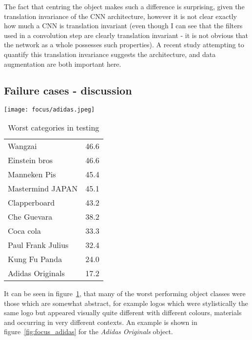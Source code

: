 The fact that centring the object makes such a difference is surprising, given the translation invariance of the CNN architecture, however it is not clear exactly how much a CNN is translation invariant (even though I can see that the filters used in a convolution step are clearly translation invariant - it is not obvious that the network as a whole possesses such properties). A recent study attempting to quantify this translation invariance \cite{EricKauderer-Abrams2016} suggests the architecture, and data augmentation are both important here. 


\subsection {Failure cases - discussion}


\begin{figure*}[t]
    \caption{Example of one hard case in the INSTRE dataset}
\centering
\texttt{[image: focus/adidas.jpeg]}
\label{fig:focus_adidas}
\end{figure*}



\begin{table}[h]
\centering
\caption{Worst categories in testing }
\begin{tabular}{ l l }
  \toprule 
  Wangzai & 46.6 \\
  Einstein bros & 46.6\\
  Manneken Pis & 45.4\\
  Mastermind JAPAN & 45.1\\
  Clapperboard & 43.2\\
  Che Guevara & 38.2\\
  Coca cola & 33.3\\
  Paul Frank Julius & 32.4\\
  Kung Fu Panda & 24.0\\
  Adidas Originals & 17.2\\
  \bottomrule
\end{tabular}
\label{fig:focus_failure}
\end{table}

It can be seen in figure~\ref{fig:focus_failure}, that many of the worst performing object classes were those which are somewhat abstract, for example logos which were stylistically the same logo but appeared visually quite different with different colours, materials and occurring in very different contexts. An example is shown in figure~\ref{fig:focus_adidas} for the \emph{Adidas Originals} object.

